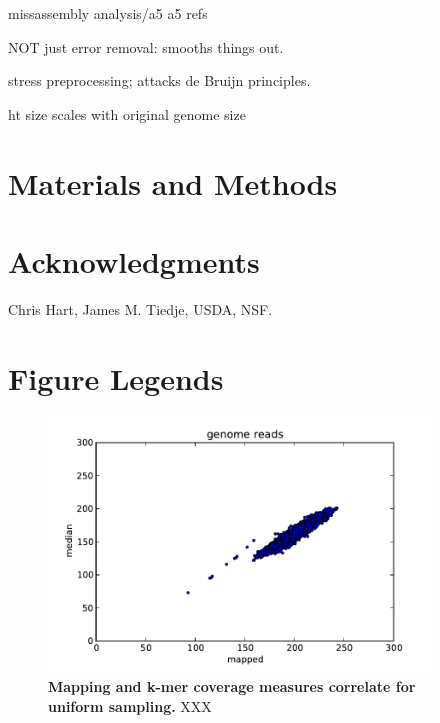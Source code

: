 \documentclass[10pt,draft]{article}
\begin{document}
missassembly analysis/a5
a5 refs

NOT just error removal: smooths things out.

stress preprocessing; attacks de Bruijn principles.

ht size scales with original genome size


\section*{Materials and Methods}

\section*{Acknowledgments}

Chris Hart, James M. Tiedje, USDA, NSF.



\section*{Figure Legends}
\begin{figure}[!ht]
\begin{center}
\includegraphics[width=4in]{diginorm-fig1a.pdf}
\end{center}
\caption{
{\bf Mapping and k-mer coverage measures correlate for uniform sampling.}
XXX
}
\label{fig:random}
\end{figure}
\end{document}
